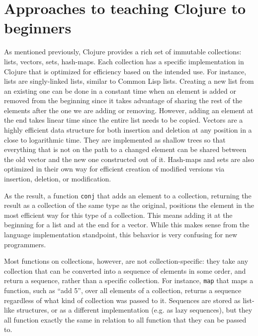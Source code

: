 \documentclass[submission,copyright,creativecommons]{eptcs}
\newcommand{\allcomments}[1]{{#1}}
\newcommand{\todo}[1]{{\bf \color{magenta}{\allcomments{ To-do: {#1}}}}}
\begin{document}

\section{Approaches to teaching Clojure to beginners}\label{sec:approaches}
As mentioned previously, Clojure provides a rich set of immutable collections: lists, vectors, sets, hash-maps. Each collection has a specific implementation in Clojure that is optimized for efficiency based on the intended use. 
For instance, lists are singly-linked lists, similar to Common Lisp lists. Creating a new list from an existing one can be done in a constant time when an element is added or removed from the beginning since it takes advantage of sharing the rest of the elements after the one we are adding or removing. %
However, adding an element at the end takes linear time since the entire list needs to be copied. 
Vectors are a highly efficient data structure for both insertion and deletion at any position in a close to logarithmic time.
They are implemented as shallow trees so that everything that is not on the path to a changed element can be shared between the old vector and the new one constructed out of it. Hash-maps and sets are also optimized in their own way for efficient creation of modified versions via insertion, deletion, or modification. 

As the result, a function {\tt conj} that adds an element to a collection, returning the result as a collection of the same type as the original, positions the element in the most efficient way for this type of a collection. This means adding it at the beginning for a list and at the end for a vector. While this makes sense from the language implementation standpoint, this behavior is very confusing for new programmers. 

Most functions on collections, however, are not collection-specific: they take any collection that can be converted into a sequence of elements in some order, and return a sequence, rather than a specific collection. For instance, {\tt map} that maps a function, such as ``add 5'', over all elements of a collection, returns a sequence regardless of what kind of collection was passed to it. Sequences are stored as list-like structures, or as a different implementation (e.g. as lazy sequences), but they all function exactly the same in relation to all function that they can be passed to. 
\end{document}
